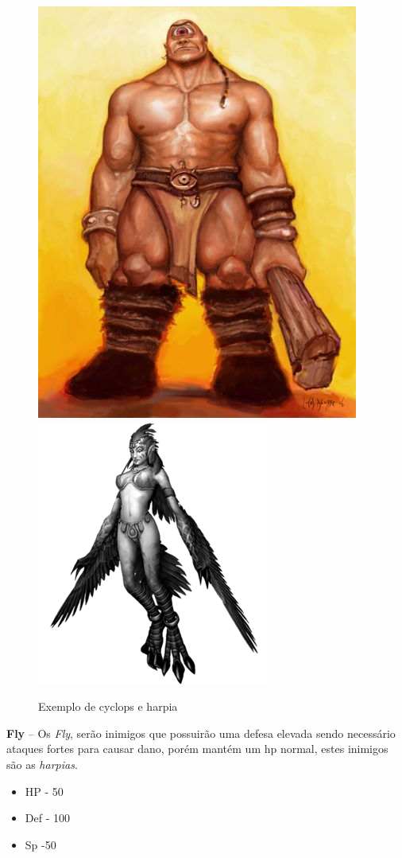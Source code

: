 \documentclass[11pt]{article} %
\begin{document}
\begin{figure}[!htp]
\centering
\includegraphics[scale=0.4]{res/characters/cyclops.jpg} \quad
\includegraphics[scale=0.7]{res/characters/harpia.png}
\caption{Exemplo de cyclops e harpia}
\label{cyclops}
\end{figure}

\textbf{{\large Fly}} – Os \textit{Fly}, serão inimigos que possuirão uma defesa elevada sendo necessário ataques fortes para causar dano, porém mantém um hp normal, estes inimigos são as \textit{harpias}.
\begin{itemize}
\item HP - 50
\item Def - 100
\item Sp -50
\end{itemize}
\end{document}
